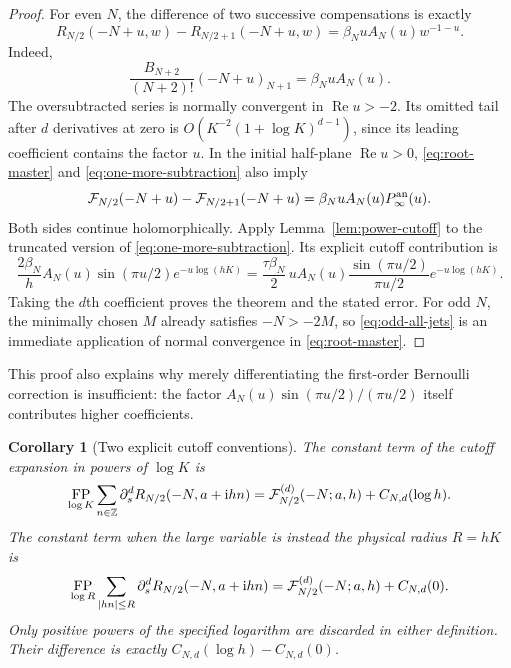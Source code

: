 \documentclass[11pt,letterpaper]{article}
\numberwithin{equation}{section}
\newtheorem{corollary}[theorem]{Corollary}
\theoremstyle{definition}
\theoremstyle{remark}
\DeclareMathOperator{\FP}{FP}
\DeclareMathOperator{\Ree}{Re}
\newcommand{\ii}{\mathrm i}
\begin{document}
\begin{proof}
For even \(N\), the difference of two successive compensations is
exactly
\begin{equation}\label{eq:one-more-subtraction}
 R_{N/2}(-N+u,w)-R_{N/2+1}(-N+u,w)
 =\beta_N uA_N(u)w^{-1-u}.
\end{equation}
Indeed,
\[
 \frac{B_{N+2}}{(N+2)!}(-N+u)_{N+1}
       =\beta_N uA_N(u).
\]
The oversubtracted series is normally convergent in
\(\Ree u>-2\). Its omitted tail after \(d\) derivatives at zero is
\(O(K^{-2}(1+\log K)^{d-1})\), since its leading coefficient
contains the factor \(u\). In the initial half-plane \(\Ree u>0\),
\eqref{eq:root-master} and \eqref{eq:one-more-subtraction} also imply
\[
 {\cal F}_{N/2}(-N+u)-{\cal F}_{N/2+1}(-N+u)
       =\beta_NuA_N(u)P_\infty^{\mathrm{an}}(u).
\]
Both sides continue holomorphically. Apply Lemma~\ref{lem:power-cutoff}
to the truncated version of \eqref{eq:one-more-subtraction}. Its
explicit cutoff contribution is
\[
 \frac{2\beta_N}{h}A_N(u)\sin(\pi u/2)e^{-u\log(hK)}
 =\frac{\tau\beta_N}{2}\,
       uA_N(u)\frac{\sin(\pi u/2)}{\pi u/2}e^{-u\log(hK)}.
\]
Taking the \(d\)th coefficient proves the theorem and the stated
error. For odd \(N\), the minimally chosen \(M\) already satisfies
\(-N>-2M\), so \eqref{eq:odd-all-jets} is an immediate application
of normal convergence in \eqref{eq:root-master}.
\end{proof}

This proof also explains why merely differentiating the first-order
Bernoulli correction is insufficient: the factor
\(A_N(u)\sin(\pi u/2)/(\pi u/2)\) itself contributes higher
coefficients.

\begin{corollary}[Two explicit cutoff conventions]\label{cor:cutoff-coordinate}
The constant term of the cutoff expansion in powers of \(\log K\)
is
\begin{equation}\label{eq:index-finite-part}
 \FP_{\log K}\sum_{n\in\mathbb Z}
     \partial_s^dR_{N/2}(-N,a+\ii hn)
 ={\cal F}_{N/2}^{(d)}(-N;a,h)+C_{N,d}(\log h).
\end{equation}
The constant term when the large variable is instead the physical
radius \(R=hK\) is
\begin{equation}\label{eq:radius-finite-part}
 \FP_{\log R}\sum_{|hn|\leq R}
     \partial_s^dR_{N/2}(-N,a+\ii hn)
 ={\cal F}_{N/2}^{(d)}(-N;a,h)+C_{N,d}(0).
\end{equation}
Only positive powers of the specified logarithm are discarded in
either definition. Their difference is exactly
\(C_{N,d}(\log h)-C_{N,d}(0)\).
\end{corollary}
\end{document}
